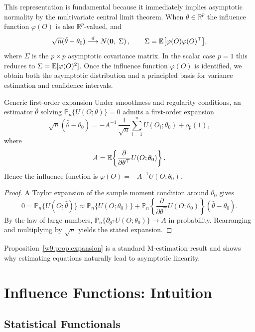 \documentclass[master.tex]{subfiles}
\begin{document}
This representation is fundamental because it immediately implies
asymptotic normality by the multivariate central limit theorem.  When
$\theta \in \mathbb{R}^p$ the influence function $\varphi(O)$ is also
$\mathbb{R}^p$-valued, and
\[
  \sqrt{n}(\hat\theta - \theta_0)
  \overset{d}{\longrightarrow}
  N\!\left(\mathbf{0},\; \Sigma\right),
  \qquad
  \Sigma = \mathbb{E}\bigl[\varphi(O)\varphi(O)^\top\bigr],
\]
where $\Sigma$ is the $p \times p$ asymptotic covariance matrix.  In
the scalar case $p = 1$ this reduces to $\Sigma = \mathbb{E}[\varphi(O)^2]$.
Once the influence function $\varphi(O)$ is identified, we obtain both
the asymptotic distribution and a principled basis for variance
estimation and confidence intervals.

\begin{prop}{Generic first-order expansion}
\label{w9:prop:expansion}
Under smoothness and regularity conditions, an estimator $\hat\theta$
solving $\mathbb{P}_n\{U(O;\theta)\}=0$ admits a first-order
expansion
\[
  \sqrt{n}(\hat\theta - \theta_0)
  =
  -A^{-1}\,\frac{1}{\sqrt{n}}\sum_{i=1}^n U(O_i;\theta_0)
  + o_p(1),
\]
where
\[
  A = \mathbb{E}\!\left\{\frac{\partial}{\partial\theta^\top}U(O;\theta_0)\right\}.
\]
Hence the influence function is $\varphi(O) = -A^{-1}U(O;\theta_0)$.
\end{prop}

\begin{proof}
A Taylor expansion of the sample moment condition around $\theta_0$
gives
\[
  0 = \mathbb{P}_n\{U(O;\hat\theta)\}
    \approx
    \mathbb{P}_n\{U(O;\theta_0)\}
    + \mathbb{P}_n\!\left\{\frac{\partial}{\partial\theta^\top}
      U(O;\theta_0)\right\}(\hat\theta - \theta_0).
\]
By the law of large numbers,
$\mathbb{P}_n\{\partial_{\theta^\top} U(O;\theta_0)\} \to A$ in
probability.  Rearranging and multiplying by $\sqrt{n}$ yields the
stated expansion.
\end{proof}

Proposition~\ref{w9:prop:expansion} is a standard M-estimation result
and shows why estimating equations naturally lead to asymptotic
linearity.

\section{Influence Functions: Intuition}
\label{w9:sec:if-intuition}

\subsection{Statistical Functionals}
\label{w9:subsec:functional}
\end{document}
